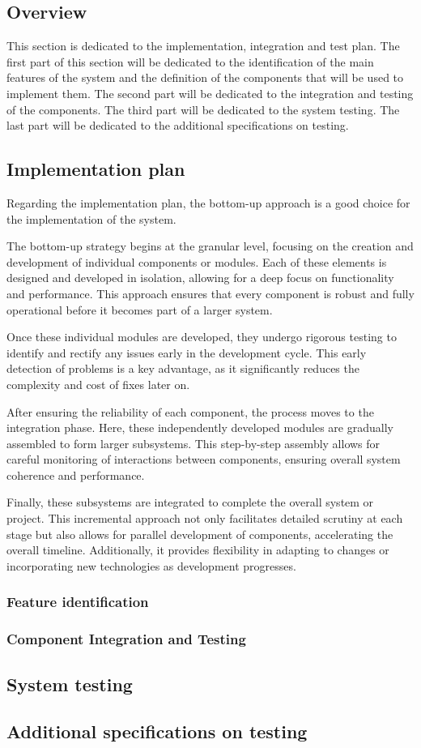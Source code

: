\subsection{Overview}
This section is dedicated to the implementation, integration and test plan. The first part of this section will be dedicated to the identification of the main features of the system and the definition of the components that will be used to implement them. The second part will be dedicated to the integration and testing of the components. The third part will be dedicated to the system testing. The last part will be dedicated to the additional specifications on testing.
\subsection{Implementation plan}
Regarding the implementation plan, the bottom-up approach is a good choice for the implementation of the system.

The bottom-up strategy begins at the granular level, focusing on the creation and development of individual components or modules. Each of these elements is designed and developed in isolation, allowing for a deep focus on functionality and performance. This approach ensures that every component is robust and fully operational before it becomes part of a larger system. 

Once these individual modules are developed, they undergo rigorous testing to identify and rectify any issues early in the development cycle. This early detection of problems is a key advantage, as it significantly reduces the complexity and cost of fixes later on. 

After ensuring the reliability of each component, the process moves to the integration phase. Here, these independently developed modules are gradually assembled to form larger subsystems. This step-by-step assembly allows for careful monitoring of interactions between components, ensuring overall system coherence and performance.

Finally, these subsystems are integrated to complete the overall system or project. This incremental approach not only facilitates detailed scrutiny at each stage but also allows for parallel development of components, accelerating the overall timeline. Additionally, it provides flexibility in adapting to changes or incorporating new technologies as development progresses. 
\subsubsection{Feature identification}
\subsubsection{Component Integration and Testing}
\subsection{System testing}
\subsection{Additional specifications on testing}